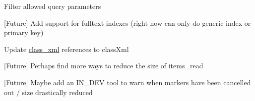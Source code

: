 \begin{DoxyRefList}
Filter allowed query parameters  
\item[\label{todo__todo000027}%
\hypertarget{todo__todo000027}{}%
Global \hyperlink{interfaceinterface_db_ae60acfb5efda8f61b513de790e48bdb7}{interface\-Db\-:\-:add\-Index} (\$table, \$name, \$fieldlist, \$is\-Primary=false)]\mbox{[}Future\mbox{]} Add support for fulltext indexes (right now can only do generic index or primary key)  
\item[\label{todo__todo000011}%
\hypertarget{todo__todo000011}{}%
Namespace \hyperlink{namespace_i_p_1_1_board}{I\-P} ]Update \hyperlink{classclass__xml}{class\-\_\-xml} references to class\-Xml

\mbox{[}Future\mbox{]} Perhaps find more ways to reduce the size of items\-\_\-read 

\mbox{[}Future\mbox{]} Maybe add an I\-N\-\_\-\-D\-E\-V tool to warn when markers have been cancelled out / size drastically reduced 


\end{DoxyRefList}
